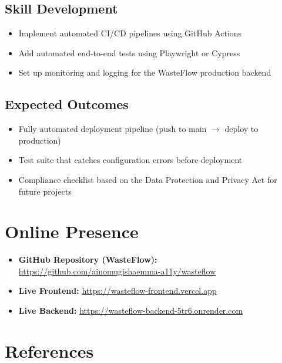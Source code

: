 \documentclass[12pt,a4paper]{article}
\begin{document}
\subsection{Skill Development}
\begin{itemize}
    \item Implement automated CI/CD pipelines using GitHub Actions
    \item Add automated end-to-end tests using Playwright or Cypress
    \item Set up monitoring and logging for the WasteFlow production backend
\end{itemize}

\subsection{Expected Outcomes}
\begin{itemize}
    \item Fully automated deployment pipeline (push to main $\rightarrow$ deploy to production)
    \item Test suite that catches configuration errors before deployment
    \item Compliance checklist based on the Data Protection and Privacy Act for future projects
\end{itemize}

\section{Online Presence}
\label{sec:online}

\begin{itemize}
    \item \textbf{GitHub Repository (WasteFlow):} \url{https://github.com/ainomugishaemma-a11y/wasteflow}
    \item \textbf{Live Frontend:} \url{https://wasteflow-frontend.vercel.app}
    \item \textbf{Live Backend:} \url{https://wasteflow-backend-5tr6.onrender.com}
\end{itemize}

\section{References}
\label{sec:references}
\end{document}
